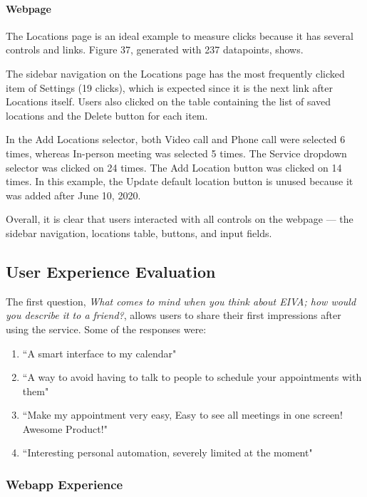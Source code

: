\documentclass{article}
\begin{document}
\paragraph{Webpage}

The Locations page is an ideal example to measure clicks because it has several controls and links. Figure 37, generated with 237 datapoints, shows.

The sidebar navigation on the Locations page has the most frequently clicked item of Settings (19 clicks), which is expected since it is the next link after Locations itself. Users also clicked on the table containing the list of saved locations and the Delete button for each item.

In the Add Locations selector, both Video call and Phone call were selected 6 times, whereas In-person meeting was selected 5 times. The Service dropdown selector was clicked on 24 times. The Add Location button was clicked on 14 times. In this example, the Update default location button is unused because it was added after June 10, 2020.

Overall, it is clear that users interacted with all controls on the webpage --- the sidebar navigation, locations table, buttons, and input fields.

\subsection{User Experience Evaluation}

The first question, \emph{What comes to mind when you think about EIVA; how would you describe it to a friend?}, allows users to share their first impressions after using the service. Some of the responses were:

\begin{enumerate}
	\item ``A smart interface to my calendar"
	\item ``A way to avoid having to talk to people to schedule your appointments with them"
	\item ``Make my appointment very easy, Easy to see all meetings in one screen! Awesome Product!"
	\item ``Interesting personal automation, severely limited at the moment"
\end{enumerate}

\subsubsection{Webapp Experience}
\end{document}
